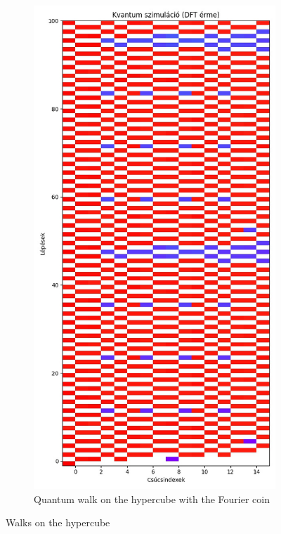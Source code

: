 \begin{figure}[H]
\begin{subfigure}{.45\linewidth}
  \end{subfigure}
  \begin{subfigure}{.45\linewidth}
    \centering
    \includegraphics[width=\linewidth]{./figures/results/hypercube/dft.jpg}
    \caption{Quantum walk on the hypercube with the Fourier coin}
  \end{subfigure}
  \caption{Walks on the hypercube}
  \label{fig:all}
\end{figure}
